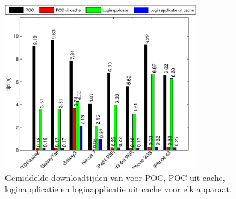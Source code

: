 % 


\section{\kendo}
\label{app:performantie-kendo}

\begin{figure}
  \centering
  \includegraphics[width=0.75\textwidth]{figuren/performance-kendo.pdf}
  \caption{Gemiddelde downloadtijden van \kendo{} voor POC,  POC uit cache,  loginapplicatie en loginapplicatie uit cache voor elk apparaat.}
  \label{fig:performantie-kendo}
\end{figure}

